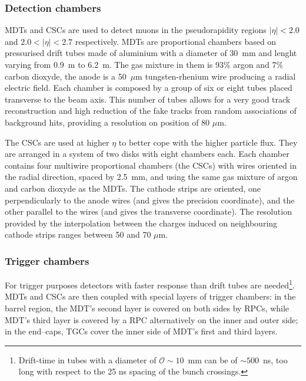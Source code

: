\subsubsection{Detection chambers}

MDTs and CSCs are used to detect muons in the pseudorapidity regions $|\eta|<2.0$ and
$2.0<|\eta|<2.7$ respectively. MDTs are proportional chambers based on
pressurised drift tubes made of aluminium with a diameter of 30~mm and lenght varying from 0.9~m to 6.2~m. 
The gas mixture in them is 93\% argon and 7\% carbon dioxyde, the anode is a 50~$\mu$m
tungsten-rhenium wire producing a radial electric field. Each chamber is composed by 
a group of six or eight tubes placed transverse to the beam axis. This number of tubes allows
for a very good track reconstruction and high reduction of the fake tracks from random 
associations of background hits, providing a resolution on position of 80 $\mu$m.


The CSCs are used at higher $\eta$ to better cope with the higher particle flux.
They are arranged in a system of two disks with eight chambers each. Each chamber
contains four multiwire proportional chambers (the CSCs) with wires oriented in the radial direction,
spaced by 2.5~mm, and using the same gas mixture of argon and carbon dioxyde as the MDTs.
The cathode strips are oriented, one perpendicularly to the anode wires (and gives the precision coordinate),
and the other parallel to the wires (and gives the transverse coordinate).
The resolution provided by the interpolation between the charges induced on neighbouring cathode strips
ranges between 50 and 70 $\mu$m.

\subsubsection{Trigger chambers}

For trigger purposes detectors with faster response than drift tubes are needed\footnote{Drift-time in tubes with a diameter of 
$\mathcal{O}\sim 10$~mm can be of $\sim500$~ns, too long with respect to the 25 ns spacing of the bunch crossings.}.
MDTs and CSCs are then coupled with special layers of trigger chambers: in the barrel region, the MDT's second layer
is covered on both sides by RPCs, while MDT's third layer is covered by a RPC alternatively on the inner and outer side;
in the end–caps, TGCs cover the inner side of MDT's first and third layers. 

